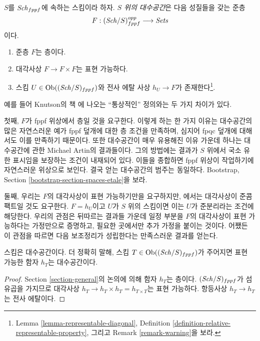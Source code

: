 \begin{definition}
\label{definition-algebraic-space}
$S$를 $\mathit{Sch}_{fppf}$에 속하는 스킴이라 하자.
{\it $S$ 위의 대수공간}은 다음 성질들을 갖는 준층
$$
F : (\mathit{Sch}/S)^{opp}_{fppf} \longrightarrow \textit{Sets}
$$
이다.
\begin{enumerate}
\item 준층 $F$는 층이다.
\item 대각사상 $F  \to F \times F$는 표현 가능하다.
\item 스킴 $U \in \mathop{\mathrm{Ob}}\nolimits((\mathit{Sch}/S)_{fppf})$와 전사 에탈 사상
$h_U \to F$가 존재한다\footnote{Lemma
\ref{lemma-representable-diagonal}, Definition
\ref{definition-relative-representable-property}, 그리고
Remark \ref{remark-warning}을 보라.}.
\end{enumerate}
\end{definition}

\noindent
예를 들어 Knutson의 책 \cite{Kn}에 나오는 ``통상적인'' 정의와는
두 가지 차이가 있다.

\medskip\noindent
첫째, $F$가 fppf 위상에서 층일 것을 요구한다. 이렇게 하는 한 가지
이유는 대수공간의 많은 자연스러운 예가 fppf 덮개에 대한 층 조건을
만족하며, 심지어 fpqc 덮개에 대해서도 이를 만족하기 때문이다. 또한
대수공간이 매우 유용해진 이유 가운데 하나는 대수공간에 관한 Michael
Artin의 결과들이다. 그의 방법에는 결과가 $S$ 위에서 국소 유한 표시임을
보장하는 조건이 내재되어 있다. 이들을 종합하면 fppf 위상이 작업하기에
자연스러운 위상으로 보인다. 결국 얻는 대수공간의 범주는 동일하다.
Bootstrap, Section \ref{bootstrap-section-spaces-etale}을 보라.

\medskip\noindent
둘째, 우리는 $F$의 대각사상이 표현 가능하기만을 요구하지만,
\cite{Kn}에서는 대각사상이 준콤팩트일 것도 요구한다.
$F = h_U$이고 $U$가 $S$ 위의 스킴이면 이는 $U$가 준분리라는 조건에
해당한다. 우리의 관점은 뒤따르는 결과들 가운데 일정 부분을 $F$의
대각사상이 표현 가능하다는 가정만으로 증명하고, 필요한 곳에서만
추가 가정을 붙이는 것이다. 어쨌든 이 관점을 따르면 다음 보조정리가
성립한다는 만족스러운 결과를 얻는다.

\begin{lemma}
\label{lemma-scheme-is-space}
스킴은 대수공간이다. 더 정확히 말해,
스킴 $T \in \mathop{\mathrm{Ob}}\nolimits((\mathit{Sch}/S)_{fppf})$가 주어지면 표현 가능한 함자 $h_T$는
대수공간이다.
\end{lemma}

\begin{proof}
Section \ref{section-general}의 논의에 의해 함자 $h_T$는 층이다.
$(\mathit{Sch}/S)_{fppf}$가 섬유곱을 가지므로 대각사상
$h_T \to h_T \times h_T = h_{T \times T}$는 표현 가능하다.
항등사상 $h_T \to h_T$는 전사 에탈이다.
\end{proof}

